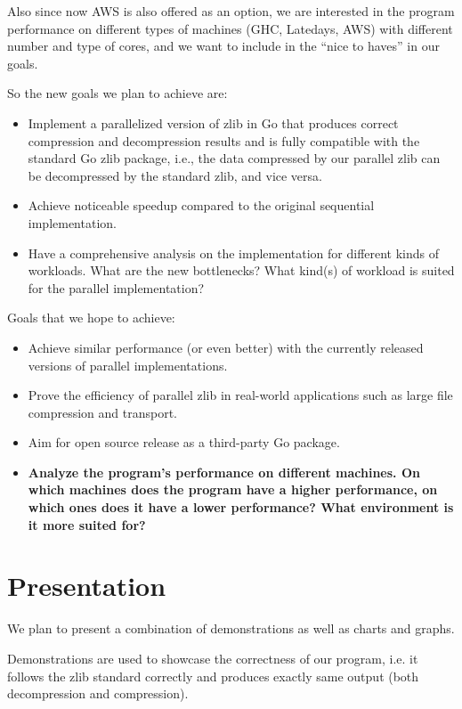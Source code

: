 \documentclass{article}
\begin{document}
\noindent Also since now AWS is also offered as an option, we are interested in the program performance on different types of machines (GHC, Latedays, AWS) with different number and type of cores, and we want to include in the ``nice to haves'' in our goals.

\noindent So the new goals we plan to achieve are:
\begin{itemize}
    \item Implement a parallelized version of zlib in Go that produces correct compression and decompression results and is fully compatible with the standard Go zlib package, i.e.,  the data compressed by our parallel zlib can be decompressed by the standard zlib, and vice versa.
    \item Achieve noticeable speedup compared to the original sequential implementation.
    \item Have a comprehensive analysis on the implementation for different kinds of workloads. What are the new bottlenecks? What kind(s) of workload is suited for the parallel implementation?
\end{itemize}

\noindent Goals that we hope to achieve:
\begin{itemize}
    \item Achieve similar performance (or even better) with the currently released versions of parallel implementations.
    \item Prove the efficiency of parallel zlib in real-world applications such as large file compression and transport.
    \item Aim for open source release as a third-party Go package.
    \item \textbf{Analyze the program's performance on different machines. On which machines does the program have a higher performance, on which ones does it have a lower performance? What environment is it more suited for?}
\end{itemize}

\section{Presentation}
We plan to present a combination of demonstrations as well as charts and graphs.

\noindent Demonstrations are used to showcase the correctness of our program, i.e. it follows the zlib standard correctly and produces exactly same output (both decompression and compression).
\end{document}
